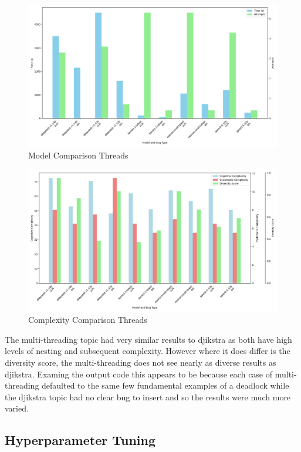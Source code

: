 \documentclass[12pt]{extarticle}
\begin{document}
\begin{figure}[h!]
\centering
\includegraphics[width=0.8\linewidth]{Images/Model_Comparison_Threads.png}
\caption{Model Comparison Threads}
\label{fig:Model_Comparison_Threads}
\end{figure}

\begin{figure}[h!]
\centering
\includegraphics[width=0.8\linewidth]{Images/Complexity_Comparison_Threads.png}
\caption{Complexity Comparison Threads}
\label{fig:Complexity_Comparison_Threads}
\end{figure}

The multi-threading topic had very similar results to djikstra as both have high levels of nesting and subsequent complexity. However where it does differ is the diversity score, the multi-threading does not see nearly as diverse results as djikstra. Examing the output code this appears to be because each case of multi-threading defaulted to the same few fundamental examples of a deadlock while the djikstra topic had no clear bug to insert and so the results were much more varied.

\subsection{Hyperparameter Tuning}


\newpage
\end{document}
